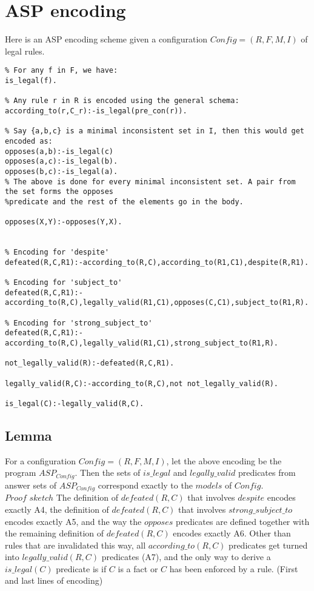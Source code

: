 \section{ASP encoding}
Here is an ASP encoding scheme given a configuration $Config = (R,F,M,I)$ of legal rules.
\begin{verbatim}
% For any f in F, we have:
is_legal(f).    

% Any rule r in R is encoded using the general schema:
according_to(r,C_r):-is_legal(pre_con(r)).

% Say {a,b,c} is a minimal inconsistent set in I, then this would get encoded as: 
opposes(a,b):-is_legal(c)
opposes(a,c):-is_legal(b).
opposes(b,c):-is_legal(a).
% The above is done for every minimal inconsistent set. A pair from the set forms the opposes
%predicate and the rest of the elements go in the body.

opposes(X,Y):-opposes(Y,X).


% Encoding for 'despite'
defeated(R,C,R1):-according_to(R,C),according_to(R1,C1),despite(R,R1).

% Encoding for 'subject_to'
defeated(R,C,R1):-according_to(R,C),legally_valid(R1,C1),opposes(C,C1),subject_to(R1,R).

% Encoding for 'strong_subject_to'
defeated(R,C,R1):-according_to(R,C),legally_valid(R1,C1),strong_subject_to(R1,R).

not_legally_valid(R):-defeated(R,C,R1).

legally_valid(R,C):-according_to(R,C),not not_legally_valid(R).

is_legal(C):-legally_valid(R,C).
\end{verbatim}
\subsection{Lemma}
For a configuration $Config=(R,F,M,I)$, let the above encoding be the program $ASP_{Config}$. Then the sets of $is\_legal$ and $legally\_valid$ predicates from answer sets of $ASP_{Config}$ correspond exactly to the $models$ of $Config$.\\
\newline
$Proof$ $sketch$ The definition of $defeated(R,C)$ that involves $despite$ encodes exactly A4, the definition of $defeated(R,C)$ that involves $strong\_subject\_to$ encodes exactly A5, and the way the $opposes$ predicates are defined together with the remaining definition of $defeated(R,C)$ encodes exactly A6. Other than rules that are invalidated this way, all $according\_to(R,C)$ predicates get turned into $legally\_valid(R,C)$ predicates (A7), and the only way to derive a $is\_legal(C)$ predicate is if $C$ is a fact or $C$ has been enforced by a rule. (First and last lines of encoding)

